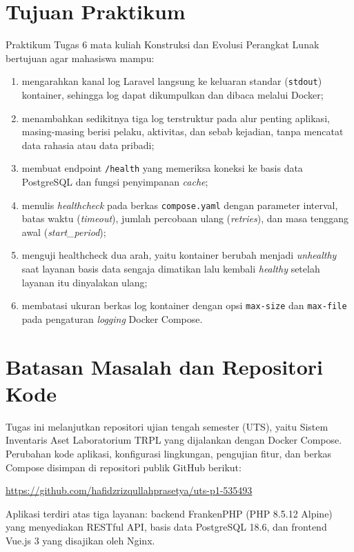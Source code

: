 \documentclass[a4paper,oneside,12pt]{report}
\begin{document}
\section{Tujuan Praktikum}
Praktikum Tugas 6 mata kuliah Konstruksi dan Evolusi Perangkat Lunak bertujuan agar mahasiswa mampu:
\begin{enumerate}
    \item mengarahkan kanal log Laravel langsung ke keluaran standar (\texttt{stdout}) kontainer, sehingga log dapat dikumpulkan dan dibaca melalui Docker;
    \item menambahkan sedikitnya tiga log terstruktur pada alur penting aplikasi, masing-masing berisi pelaku, aktivitas, dan sebab kejadian, tanpa mencatat data rahasia atau data pribadi;
    \item membuat endpoint \texttt{/health} yang memeriksa koneksi ke basis data PostgreSQL dan fungsi penyimpanan \textit{cache};
    \item menulis \textit{healthcheck} pada berkas \texttt{compose.yaml} dengan parameter interval, batas waktu (\textit{timeout}), jumlah percobaan ulang (\textit{retries}), dan masa tenggang awal (\textit{start\_period});
    \item menguji healthcheck dua arah, yaitu kontainer berubah menjadi \textit{unhealthy} saat layanan basis data sengaja dimatikan lalu kembali \textit{healthy} setelah layanan itu dinyalakan ulang;
    \item membatasi ukuran berkas log kontainer dengan opsi \texttt{max-size} dan \texttt{max-file} pada pengaturan \textit{logging} Docker Compose.
\end{enumerate}

\section{Batasan Masalah dan Repositori Kode}
Tugas ini melanjutkan repositori ujian tengah semester (UTS), yaitu Sistem Inventaris Aset Laboratorium TRPL yang dijalankan dengan Docker Compose. Perubahan kode aplikasi, konfigurasi lingkungan, pengujian fitur, dan berkas Compose disimpan di repositori publik GitHub berikut:
\begin{center}
    \url{https://github.com/hafidzrizqullahprasetya/uts-p1-535493}
\end{center}
Aplikasi terdiri atas tiga layanan: backend FrankenPHP (PHP 8.5.12 Alpine) yang menyediakan RESTful API, basis data PostgreSQL 18.6, dan frontend Vue.js 3 yang disajikan oleh Nginx.
\end{document}
